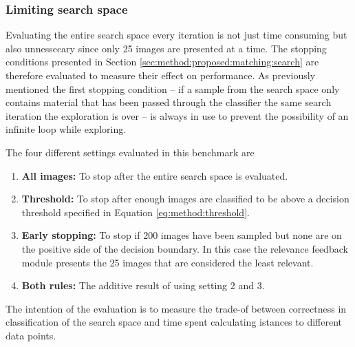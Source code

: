 \subsubsection{Limiting search space}
\label{sec:method:eval:param:stopping}

Evaluating the entire search space every iteration is not just time consuming but also unnessecary since only 25 images are presented at a time. The stopping conditions presented in Section \ref{sec:method:proposed:matching:search} are therefore evaluated to measure their effect on performance.
As previously mentioned the first stopping condition -- if a sample from the search space only contains material that has been passed through the classifier the same search iteration the exploration is over --  is always in use to prevent the possibility of an infinite loop while exploring. 

The four different settings evaluated in this benchmark are
\begin{enumerate}
	\item \textbf{All images:} To stop after the entire search space is evaluated. 
	\item \textbf{Threshold:} To stop after enough images are classified to be above a decision threshold specified in Equation \ref{eq:method:threshold}. 
	\item \textbf{Early stopping:} To stop if 200 images have been sampled but none are on the positive side of the decision boundary. In this case the relevance feedback module presents the 25 images that are considered the least relevant. 
	\item \textbf{Both rules:} The additive result of using setting 2 and 3.
\end{enumerate} 
\medskip

The intention of the evaluation is to measure the trade-of between correctness in classification of the search space and time spent calculating istances to different data points.
